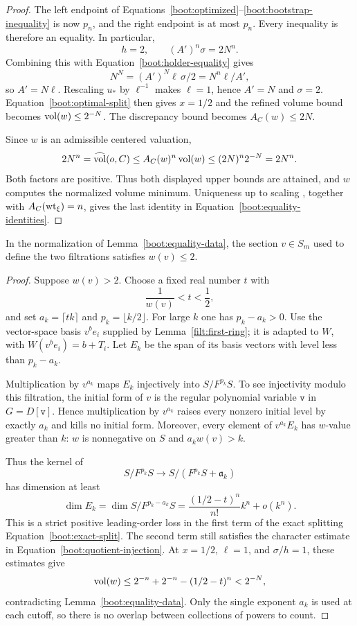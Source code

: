 \begin{proof}
The left endpoint of
Equations~\eqref{boot:optimized}--\eqref{boot:bootstrap-inequality}
is now $p_n$, and the right endpoint is at most $p_n$.
Every inequality is therefore an equality.  In particular,
\[
 h=2,
 \qquad (A')^n\sigma=2N^n.
\]
Combining this with Equation~\eqref{boot:holder-equality}
gives
\[
 N^N=(A')^N\ell\,\sigma/2
     =N^n\ell/A',
\]
so $A'=N\ell$.  Rescaling $u_*$ by $\ell^{-1}$ makes
$\ell=1$, hence $A'=N$ and $\sigma=2$.
Equation~\eqref{boot:optimal-split} then gives $x=1/2$ and
the refined volume bound becomes $\operatorname{vol}(w)\leq2^{-N}$.
The discrepancy bound becomes $A_C(w)\leq2N$.

Since $w$ is an admissible centered valuation,
\[
 2N^n=\widehat{\operatorname{vol}}(o,C)
 \leq A_C(w)^n\operatorname{vol}(w)
 \leq (2N)^n2^{-N}=2N^n.
\]
Both factors are positive.  Thus both displayed upper
bounds are attained, and $w$ computes the normalized
volume minimum.  Uniqueness up to scaling
\cite[Theorem~1.1]{XZ21}, together with
$A_C(\operatorname{wt}_\xi)=n$, gives the last identity in
Equation~\eqref{boot:equality-identities}.
\end{proof}

\begin{lemma}
\label{boot:strict-count}
In the normalization of Lemma~\ref{boot:equality-data},
the section $v\in S_m$ used to define the two filtrations
satisfies $w(v)\leq2$.
\end{lemma}

\begin{proof}
Suppose $w(v)>2$.  Choose a fixed real number $t$ with
\[
 \frac1{w(v)}<t<\frac12,
\]
and set $a_k=\lceil tk\rceil$ and $p_k=\lfloor k/2\rfloor$.
For large $k$ one has $p_k-a_k>0$.  Use the vector-space
basis $v^b e_i$ supplied by
Lemma~\ref{filt:first-ring}; it is adapted to $W$, with
$W(v^b e_i)=b+T_i$.  Let $E_k$ be the span of its basis
vectors with level less than $p_k-a_k$.

Multiplication by $v^{a_k}$ maps $E_k$ injectively into
$S/F^{p_k}S$.  To see injectivity modulo this filtration,
the initial form of $v$ is the regular polynomial variable
$\mathtt v$ in $G=D[\mathtt v]$.  Hence multiplication by
$v^{a_k}$ raises every nonzero initial level by exactly
$a_k$ and kills no initial form.  Moreover, every element
of $v^{a_k}E_k$ has $w$-value greater than $k$: $w$ is
nonnegative on $S$ and $a_kw(v)>k$.

Thus the kernel of
\[
 S/F^{p_k}S\longrightarrow S/(F^{p_k}S+\mathfrak a_k)
\]
has dimension at least
\[
 \dim E_k
 =\dim S/F^{p_k-a_k}S
 =\frac{(1/2-t)^n}{n!}k^n+o(k^n).
\]
This is a strict positive leading-order loss in the first
term of the exact splitting
Equation~\eqref{boot:exact-split}.  The second term still
satisfies the character estimate in
Equation~\eqref{boot:quotient-injection}.  At $x=1/2$,
$\ell=1$, and $\sigma/h=1$, these estimates give
\[
 \operatorname{vol}(w)
 \leq 2^{-n}+2^{-n}-(1/2-t)^n
 <2^{-N},
\]
contradicting Lemma~\ref{boot:equality-data}.
Only the single exponent $a_k$ is used at each cutoff, so
there is no overlap between collections of powers to count.
\end{proof}

